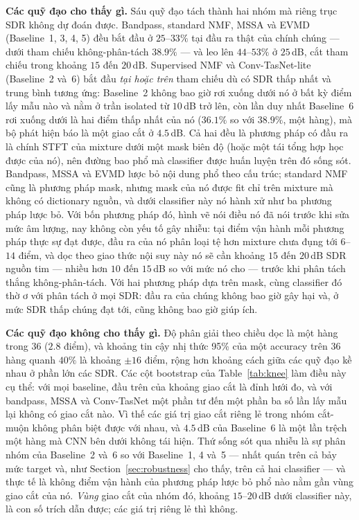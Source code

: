 \documentclass[11pt]{article}
\begin{document}
\textbf{Các quỹ đạo cho thấy gì.} Sáu quỹ đạo tách thành hai nhóm mà
riêng trục SDR không dự đoán được. Bandpass, standard NMF, MSSA và EVMD
(Baseline~1, 3, 4, 5) đều bắt đầu ở $25$--$33\%$ tại đầu ra thật của
chính chúng --- dưới tham chiếu không-phân-tách $38.9\%$ --- và leo lên
$44$--$53\%$ ở $25$\,dB, cắt tham chiếu trong khoảng $15$ đến $20$\,dB.
Supervised NMF và Conv-TasNet-lite (Baseline~2 và~6) bắt đầu \emph{tại
hoặc trên} tham chiếu dù có SDR thấp nhất và trung bình tương ứng:
Baseline~2 không bao giờ rơi xuống dưới nó ở bất kỳ điểm lấy mẫu nào và
nằm ở trần isolated từ $10$\,dB trở lên, còn lần duy nhất Baseline~6 rơi
xuống dưới là hai điểm thấp nhất của nó ($36.1\%$ so với $38.9\%$, một
hàng), mà bộ phát hiện báo là một giao cắt ở $4.5$\,dB. Cả hai đều là
phương pháp có đầu ra là chính STFT của mixture dưới một mask biên độ
(hoặc một tái tổng hợp học được của nó), nên đường bao phổ mà classifier
được huấn luyện trên đó sống sót. Bandpass, MSSA và EVMD lược bỏ nội dung
phổ theo cấu trúc; standard NMF cũng là phương pháp mask, nhưng mask của
nó được fit chỉ trên mixture mà không có dictionary nguồn, và dưới
classifier này nó hành xử như ba phương pháp lược bỏ. Với bốn phương pháp
đó, hình vẽ nói điều nó đã nói trước khi sửa mức âm lượng, nay không còn
yếu tố gây nhiễu: tại điểm vận hành mỗi phương pháp thực sự đạt được, đầu
ra của nó phân loại tệ hơn mixture chưa đụng tới $6$--$14$ điểm, và dọc
theo giao thức nội suy này nó sẽ cần khoảng $15$ đến $20$\,dB SDR nguồn
tim --- nhiều hơn $10$ đến $15$\,dB so với mức nó cho --- trước khi phân
tách thắng không-phân-tách. Với hai phương pháp dựa trên mask, cùng
classifier đó thờ ơ với phân tách ở mọi SDR: đầu ra của chúng không bao
giờ gây hại và, ở mức SDR thấp chúng đạt tới, cũng không bao giờ giúp ích.

\textbf{Các quỹ đạo không cho thấy gì.} Độ phân giải theo chiều dọc là
một hàng trong 36 ($2.8$ điểm), và khoảng tin cậy nhị thức 95\% của một
accuracy trên 36 hàng quanh $40\%$ là khoảng $\pm16$ điểm, rộng hơn
khoảng cách giữa các quỹ đạo kề nhau ở phần lớn các SDR. Các cột bootstrap
của Table~\ref{tab:knee} làm điều này cụ thể: với mọi baseline, đầu trên
của khoảng giao cắt là đỉnh lưới đo, và với bandpass, MSSA và Conv-TasNet
một phần tư đến một phần ba số lần lấy mẫu lại không có giao cắt nào. Vì
thế các giá trị giao cắt riêng lẻ trong nhóm cắt-muộn không phân biệt
được với nhau, và $4.5$\,dB của Baseline~6 là một lần trệch một hàng mà
CNN bên dưới không tái hiện. Thứ sống sót qua nhiễu là sự phân nhóm của
Baseline~2 và~6 so với Baseline~1, 4 và~5 --- nhất quán trên cả bảy mức
target và, như Section~\ref{sec:robustness} cho thấy, trên cả hai
classifier --- và thực tế là không điểm vận hành của phương pháp lược bỏ
phổ nào nằm gần vùng giao cắt của nó. \emph{Vùng} giao cắt của nhóm đó,
khoảng $15$--$20$\,dB dưới classifier này, là con số trích dẫn được; các
giá trị riêng lẻ thì không.
\end{document}
